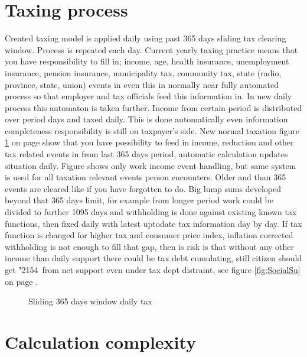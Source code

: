 \section{Taxing process}
\label{tax_process}
Created taxing model is applied daily using past 365 days sliding tax clearing window.
Process is repeated each day.
Current yearly taxing practice means that you have responsibility to fill in;
income, age, health insurance, unemployment insurance, pension insurance,
municipality tax, community tax, state (radio, province, state, union) events
in even this in normally near fully automated process so that employer
and tax officials feed this information in.
In new daily process this automaton is taken further.
Income from certain period is distributed over period days and taxed daily.
This is done automatically even information completeness responsibility is still on taxpayer's side.
New normal taxation figure \ref{fig:taxing} on page \pageref{fig:taxing}
show that you have possibility to feed in income, reduction
and other tax related events in from last 365 days period,
automatic calculation updates situation daily.
Figure shows only work income event handling,
but same system is used for all taxation relevant events person encounters.
Older and than 365 events are cleared like if you have forgotten to do.
Big lump sums developed beyond that 365 days limit,
for example from longer period work could be divided to further 1095 days
and withholding is done against existing known tax functions,
then fixed daily with latest up\-to\-date tax information day by day.
If tax function is changed for higher tax and consumer price index,
inflation corrected withholding is not enough to fill that gap,
then is risk is that without any other income than daily support there could be tax debt cumulating,
still citizen should get \char"2154~from net support even under tax dept distraint,
see figure \ref{fig:SocialSu} on page \pageref{fig:SocialSu}.
\begin{figure} %
 \begin{center}
  \caption{Sliding 365 days window daily tax}
  \label{fig:taxing} 
 \end{center}
\end{figure}

\section{Calculation complexity}
\label{calculation_complexity}

